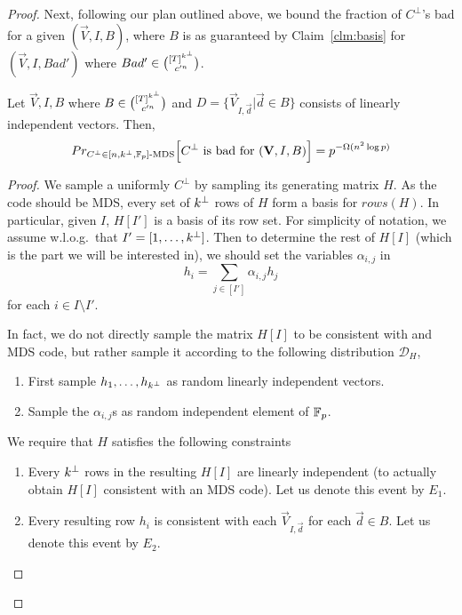 \begin{proof}
Next, following our plan outlined above, we bound the fraction of $C^\bot$'s bad for a given $(\vec{V},I,B)$, where $B$ is as guaranteed by Claim~\ref{clm:basis} for $(\vec{V},I,Bad')$ where $Bad'\in \binom{[T]^{k^\bot}}{c'^n}$. 

\begin{claim} \label{clm:probbad}
Let $\vec{V},I,B$ where $B\in \binom{[T]^{k^\bot}}{c'^n}$ and $D=\{\vec{V}_{I,\vec{d}}|\vec{d}\in B\}$ consists of linearly independent vectors. Then, 
\begin{align}
Pr_{C^\bot\in[n,k^\bot,\mathbb{F}_p]\text{-MDS}}\Big[C^\bot\text{ is bad for }(\mathbf{V},I,B)\Big]=p^{-\Omega(n^2\log{p})}
\end{align}
\end{claim}

\begin{proof}
We sample a uniformly $C^\bot$ by sampling its generating matrix $H$.
As the code should be MDS, every set of $k^\bot$ rows of $H$ form a basis for $rows(H)$. In particular, given $I$, $H[I']$ is a basis of its row set. 
For simplicity of notation, we assume w.l.o.g.\ that
$I'=[1,\ldots,k^\bot]$. Then to determine the rest of $H[I]$ (which is the part we will be interested in), we should set the variables $\alpha_{i,j}$ in
$$h_i=\sum_{j\in[I']}\alpha_{i,j} h_j$$ 
for each $i\in I \setminus I'$.

\noindent In fact, we do not directly sample the matrix $H[I]$ to be consistent with and MDS code, but rather
sample it according to the following distribution $\mathcal{D}_H$,
\begin{enumerate}
\item First sample $h_1,\ldots,h_{k^\bot}$ as random linearly independent vectors.   
\item Sample the $\alpha_{i,j}$s as random independent element of $\mathbb{F}_p$.
\end{enumerate}


\noindent We require that $H$ satisfies the following constraints
\begin{enumerate}
\item Every $k^\bot$ rows in the resulting $H[I]$ are linearly independent (to actually obtain $H[I]$ consistent with an MDS code). Let us denote this event by $E_1$. 
\item %
Every resulting row $h_i$ is consistent with each $\vec{V}_{I,\vec{d}}$ for each $\vec{d}\in B$. 
Let us denote this event by $E_2$.
\end{enumerate}


\end{proof}
\end{proof}
